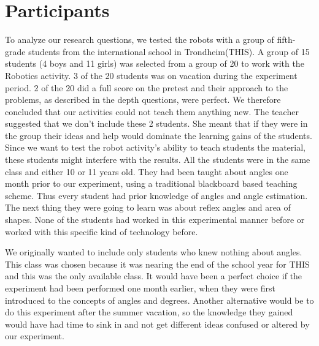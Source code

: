 \chapter{Participants}
To analyze our research questions, we tested the robots with a group of fifth-grade students from the international school in Trondheim(THIS). A group of 15 students (4 boys and 11 girls) was selected from a group of 20 to work with the Robotics activity. 3 of the 20 students was on vacation during the experiment period. 2 of the 20 did a full score on the pretest and their approach to the problems, as described in the depth questions, were perfect. We therefore concluded that our activities could not teach them anything new. The teacher suggested that we don't include these 2 students. She meant that if they were in the group their ideas and help would dominate the learning gains of the students. Since we want to test the robot activity's ability to teach students the material, these students might interfere with the results. 
All the students were in the same class and either 10 or 11 years old. They had been taught about angles one month prior to our experiment, using a traditional blackboard based teaching scheme. Thus every student had prior knowledge of angles and angle estimation. The next thing they were going to learn was about reflex angles and area of shapes. None of the students had worked in this experimental manner before or worked with this specific kind of technology before.

\bigskip\noindent
We originally wanted to include only students who knew nothing about angles. This class was chosen because it was nearing the end of the school year for THIS and this was the only available class. It would have been a perfect choice if the experiment had been performed one month earlier, when they were first introduced to the concepts of angles and degrees. Another alternative would be to do this experiment after the summer vacation, so the knowledge they gained would have had time to sink in and not get different ideas confused or altered by our experiment. 